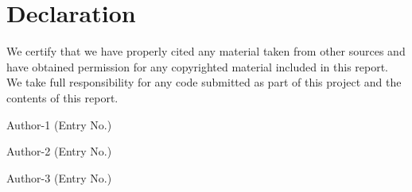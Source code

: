 \chapter*{\centering Declaration}
We certify that we have properly cited any material taken from other sources and have obtained permission for any copyrighted material included in this report. We take full responsibility for any code submitted as part of this  project and the contents of this report.\\
\vspace*{15mm}

\begin{flushright}
Author-1 (Entry No.)\\
\end{flushright}

\vspace*{15mm}

\begin{flushright}
Author-2 (Entry No.)\\
\end{flushright}

\vspace*{15mm}

\begin{flushright}
Author-3 (Entry No.)\\
\end{flushright}

